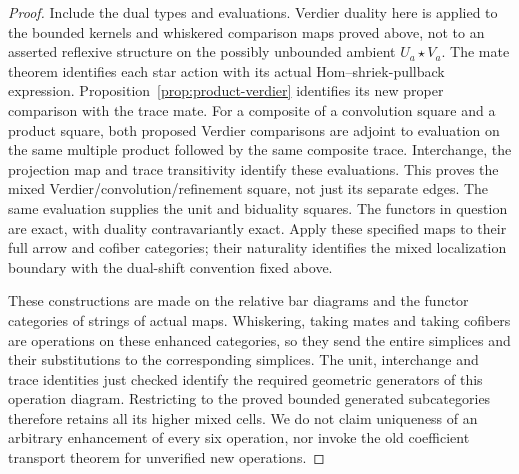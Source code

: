 \documentclass[11pt]{article}
\theoremstyle{definition}
\theoremstyle{remark}
\begin{document}
\begin{proof}
Include the dual types and evaluations.  Verdier duality here is
applied to the bounded kernels and whiskered comparison maps proved
above, not to an asserted reflexive structure on the possibly
unbounded ambient $U_a\star V_a$.  The mate theorem identifies
each star action with its actual Hom--shriek-pullback expression.
Proposition~\ref{prop:product-verdier} identifies its new proper
comparison with the trace mate.  For a composite of a convolution
square and a product square, both proposed Verdier comparisons are
adjoint to evaluation on the same multiple product followed by the
same composite trace.  Interchange, the projection map and trace
transitivity identify these evaluations.  This proves the mixed
Verdier/convolution/refinement square, not just its separate edges.
The same evaluation supplies the unit and biduality squares.
The functors in question are exact, with duality contravariantly
exact.  Apply these specified maps to their full arrow and cofiber
categories; their naturality identifies the mixed localization
boundary with the dual-shift convention fixed above.

These constructions are made on the relative bar diagrams and the
functor categories of strings of actual maps.  Whiskering, taking
mates and taking cofibers are operations on these enhanced categories,
so they send the entire simplices and their substitutions to the
corresponding simplices.  The unit, interchange and trace identities
just checked identify the required geometric generators of this
operation diagram.  Restricting to the proved bounded generated
subcategories therefore retains all its higher mixed cells.  We do
not claim uniqueness of an arbitrary enhancement of every six
operation, nor invoke the old coefficient transport theorem for
unverified new operations.


\end{proof}
\end{document}
